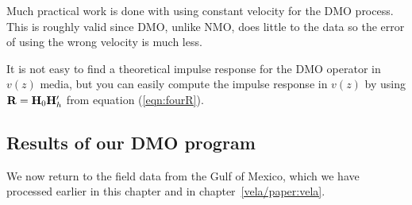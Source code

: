 %
%
%

\par
Much practical work is done with using constant velocity for the DMO process.
This is roughly valid since DMO, unlike NMO, does little
to the data so the error of using the wrong velocity is much less.

\par
It is not easy to find a theoretical impulse response
for the DMO operator in $v(z)$ media,
but you can easily compute the impulse response in $v(z)$
by using $\bold R=\bold H_0\bold H_h'$ from
equation (\ref{eqn:fourR}).

\subsection{Results of our DMO program}
\par
We now return to the field data from the Gulf of Mexico,
which we have processed earlier
in this chapter and in chapter~\ref{vela/paper:vela}.  

